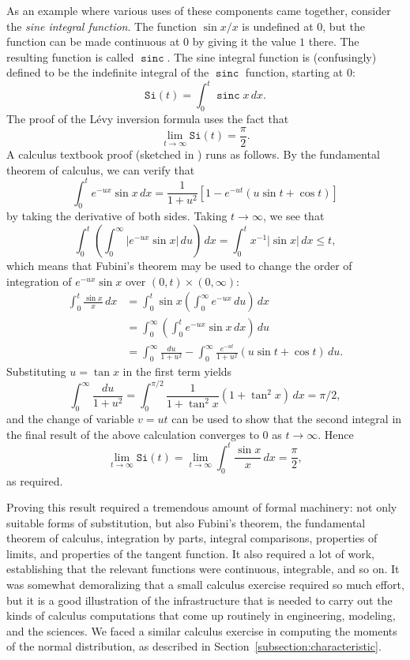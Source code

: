 \documentclass{svjour3}
\newcommand{\fn}[1]{\mathtt{#1}} %
\newcommand{\sinc}{\mathop{\fn{sinc}}\nolimits}
\begin{document}
As an example where various uses of these components came together, consider the \emph{sine integral function}. The function $\sin x / x$ is undefined at $0$, but the function can be made continuous at $0$ by giving it the value $1$ there. The resulting function is called $\sinc$. The sine integral function is (confusingly) defined to be the indefinite integral of the $\sinc$ function, starting at $0$:
\[ 
\fn{Si}(t) = \int_0^t \sinc x \, dx. 
\]
The proof of the L\'evy inversion formula uses the fact that 
\[ 
\lim_{t \rightarrow \infty} \fn{Si}(t) = \frac{\pi}{2}.
\]
A calculus textbook proof (sketched in \cite[Example 18.4]{billingsley:95}) runs as follows. By the fundamental theorem of calculus, we can verify that
\[ 
\int_0^t e^{-ux} \sin x \, dx = \frac{1}{1+u^2}[1 - e^{-ut}(u \sin t + \cos t)] 
\]
by taking the derivative of both sides.  Taking $t \rightarrow \infty$, we see that
\[ 
\int_0^t \left( \int_0^\infty |e^{-ux} \sin x| \, du\right) \, dx = \int_0^t x^{-1} |\sin x| \, dx \le t,
\]
which means that Fubini's theorem may be used to change the order of integration of $e^{-ux} \sin x$ over $(0,t) \times (0, \infty)$:
\begin{align*}
\int_0^t \frac{\sin x}{x} \, dx &= \int_0^t \sin x \left(\int_0^\infty e^{-ux} \, du\right) \, dx \\
                                &= \int_0^\infty \left(\int_0^t e^{-ux} \sin x \, dx\right) \, du \\
                                &= \int_0^\infty \frac{du}{1+u^2} - \int_0^\infty \frac{e^{-ut}}{1+u^2} (u \sin t + \cos t) \, du.
\end{align*}
Substituting $u = \tan x$ in the first term yields
\[
 \int_0^\infty \frac{du}{1+u^2} = \int_0^{\pi/2} \frac{1}{1 + \tan^2 x} (1 + \tan^2 x) \, dx = \pi/2,
\]
and the change of variable $v = ut$ can be used to show that the second integral in the final result of the above calculation converges to $0$ as $t \rightarrow \infty$. Hence
\[ 
\lim_{t \rightarrow \infty} \fn{Si}(t) = \lim_{t \rightarrow \infty} \int_0^t \frac{\sin x}{x} \, dx = \frac{\pi}{2},
\]
as required. 

Proving this result required a tremendous amount of formal machinery: not only suitable forms of substitution, but also Fubini's theorem, the fundamental theorem of calculus, integration by parts, integral comparisons, properties of limits, and properties of the tangent function. It also required a lot of work, establishing that the relevant functions were continuous, integrable, and so on. It was somewhat demoralizing that a small calculus exercise required so much effort, but it is a good illustration of the infrastructure that is needed to carry out the kinds of calculus computations that come up routinely in engineering, modeling, and the sciences. We faced a similar calculus exercise in computing the moments of the normal distribution, as described in Section~\ref{subsection:characteristic}.
\end{document}
